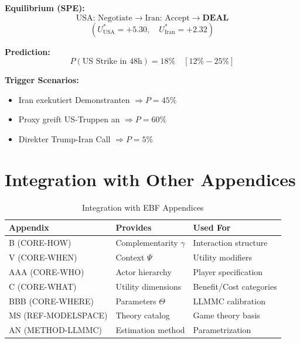 \begin{tcolorbox}[colback=green!5!white, colframe=green!75!black,
    title=Worked Example: US-Iran January 2026]
\textbf{Equilibrium (SPE):}
\[
\text{USA: Negotiate} \rightarrow \text{Iran: Accept} \rightarrow \textbf{DEAL}
\]
\[
(U^*_{\text{USA}} = +5.30, \quad U^*_{\text{Iran}} = +2.32)
\]

\textbf{Prediction:}
\[
P(\text{US Strike in 48h}) = 18\% \quad [12\%-25\%]
\]

\textbf{Trigger Scenarios:}
\begin{itemize}[nosep]
\item Iran exekutiert Demonstranten $\Rightarrow P = 45\%$
\item Proxy greift US-Truppen an $\Rightarrow P = 60\%$
\item Direkter Trump-Iran Call $\Rightarrow P = 5\%$
\end{itemize}

\end{tcolorbox}



\section{Integration with Other Appendices}
\label{sec:crisis-integration}

\begin{table}[h]
\centering
\begin{tabular}{lll}
\toprule
\textbf{Appendix} & \textbf{Provides} & \textbf{Used For} \\
\midrule
B (CORE-HOW) & Complementarity $\gamma$ & Interaction structure \\
V (CORE-WHEN) & Context $\Psi$ & Utility modifiers \\
AAA (CORE-WHO) & Actor hierarchy & Player specification \\
C (CORE-WHAT) & Utility dimensions & Benefit/Cost categories \\
BBB (CORE-WHERE) & Parameters $\Theta$ & LLMMC calibration \\
MS (REF-MODELSPACE) & Theory catalog & Game theory basis \\
AN (METHOD-LLMMC) & Estimation method & Parametrization \\
\bottomrule
\end{tabular}
\caption{Integration with EBF Appendices}
\label{tab:integration}
\end{table}


